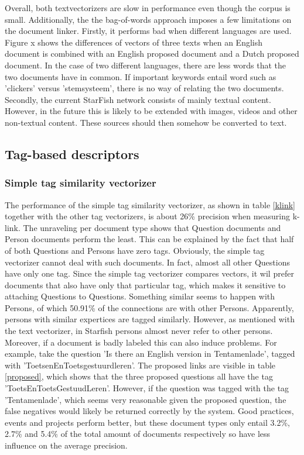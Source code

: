 Overall, both textvectorizers are slow in performance even though the corpus is small. Additionally, the the bag-of-words approach imposes a few limitations on the document linker. Firstly, it performs bad when different languages are used. Figure x shows the differences of vectors of three texts when an English document is combined with an English proposed document and a Dutch proposed document. In the case of two different languages, there are less words that the two documents have in common. If important keywords entail word such as 'clickers' versus 'stemsysteem', there is no way of relating the two documents. Secondly, the current StarFish network consists of mainly textual content. However, in the future this is likely to be extended with images, videos and other non-textual content. These sources should then somehow be converted to text.

\subsection{Tag-based descriptors}

\subsubsection{Simple tag similarity vectorizer}
The performance of the simple tag similarity vectorizer, as shown in table \ref{klink} together with the other tag vectorizers, is about 26\% precision when measuring k-link. The unraveling per document type shows that Question documents and Person documents perform the least. This can be explained by the fact that half of both Questions and Persons have zero tags. Obviously, the simple tag vectorizer cannot deal with such documents. In fact, almost all other Questions have only one tag. Since the simple tag vectorizer compares vectors, it wil prefer documents that also have only that particular tag, which makes it sensitive to attaching Questions to Questions. Something similar seems to happen with Persons, of which 50.91\% of the connections are with other Persons. Apparently, persons with similar expertices are tagged similarly. However, as mentioned with the text vectorizer, in Starfish persons almost never refer to other persons. Moreover, if a document is badly labeled this can also induce problems. For example, take the question 'Is there an English version in Tentamenlade', tagged with 'ToetsenEnToetsgestuurdleren'. The proposed links are visible in table \ref{proposed}, which shows that  the three proposed questions all have the tag 'ToetsEnToetsGestuudLeren'. However, if the question was tagged with the tag 'Tentamenlade', which seems very reasonable given the proposed question, the false negatives would likely be returned correctly by the system. Good practices, events and projects perform better, but these document types only entail 3.2\%, 2.7\% and 5.4\% of the total amount of documents respectively so have less influence on the average precision.

